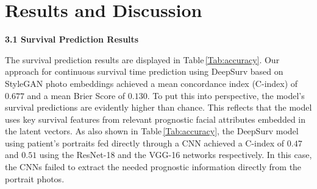 \documentclass[runningheads]{llncs}
\newcommand{\TODO}[1]{\textcolor{red}{#1}}
\begin{document}


\section{Results and Discussion}
\textbf{3.1 Survival Prediction Results}

The survival prediction results are displayed in Table\,\ref{Tab:accuracy}. 
Our approach for continuous survival time prediction using DeepSurv based on StyleGAN photo embeddings achieved a mean concordance index (C-index) of $0.677$ and a mean Brier Score of $0.130$. To put this into perspective, the model's survival predictions are evidently higher than chance. 
This reflects that the model uses key survival features from relevant prognostic facial attributes embedded in the latent vectors. As also shown in Table\,\ref{Tab:accuracy}, the DeepSurv model using patient's portraits fed directly through a CNN achieved a C-index of $0.47$ and $0.51$ using the ResNet-18 and the VGG-16 networks respectively.
In this case, the CNNs failed to extract the needed prognostic information directly from the portrait photos. 
\end{document}
